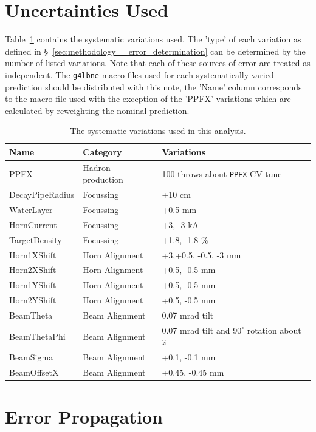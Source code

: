 \documentclass{article}
\begin{document}
\section{Uncertainties Used}

\label{sec:uncertainties_used}
Table~\ref{tbl:uncertdefn} contains the systematic variations used. The 'type' of each variation as defined in \S~\ref{sec:methodology__error_determination} can be determined by the number of listed variations. Note that each of these sources of error are treated as independent. The \texttt{g4lbne} macro files used for each systematically varied prediction should be distributed with this note, the 'Name' column corresponds to the macro file used with the exception of the 'PPFX' variations which are calculated by reweighting the nominal prediction.

\begin{table}
\centering
\begin{tabular}{l|l|l}
Name & Category & Variations \\
\hline
PPFX & Hadron production & 100 throws about \texttt{PPFX} CV tune \\
\hline
DecayPipeRadius & Focussing & +10 cm \\
WaterLayer & Focussing & +0.5 mm \\
HornCurrent & Focussing & +3, -3 kA \\
TargetDensity & Focussing & +1.8, -1.8 \% \\
\hline
Horn1XShift & Horn Alignment & +3,+0.5, -0.5, -3 mm\\
Horn2XShift & Horn Alignment & +0.5, -0.5 mm \\
Horn1YShift & Horn Alignment & +0.5, -0.5 mm \\
Horn2YShift & Horn Alignment & +0.5, -0.5 mm \\
\hline
BeamTheta & Beam Alignment & 0.07 mrad tilt \\
BeamThetaPhi & Beam Alignment & 0.07 mrad tilt and $90^{\circ}$ rotation about $\hat{z}$ \\
BeamSigma & Beam Alignment & +0.1, -0.1 mm \\
BeamOffsetX & Beam Alignment & +0.45, -0.45 mm \\
\end{tabular}
\caption{The systematic variations used in this analysis.}
\label{tbl:uncertdefn}
\end{table}

\section{Error Propagation}
\end{document}
